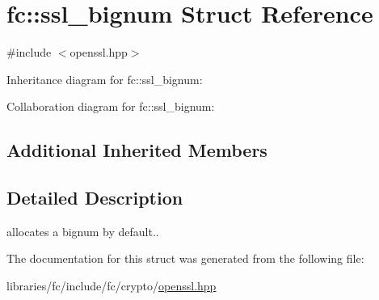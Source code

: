 \hypertarget{structfc_1_1ssl__bignum}{}\section{fc\+:\+:ssl\+\_\+bignum Struct Reference}
\label{structfc_1_1ssl__bignum}


{\ttfamily \#include $<$openssl.\+hpp$>$}



Inheritance diagram for fc\+:\+:ssl\+\_\+bignum\+:


Collaboration diagram for fc\+:\+:ssl\+\_\+bignum\+:
\subsection*{Additional Inherited Members}


\subsection{Detailed Description}
allocates a bignum by default.. 

The documentation for this struct was generated from the following file\+:\begin{DoxyCompactItemize}
\item 
libraries/fc/include/fc/crypto/\mbox{\hyperlink{openssl_8hpp}{openssl.\+hpp}}\end{DoxyCompactItemize}
